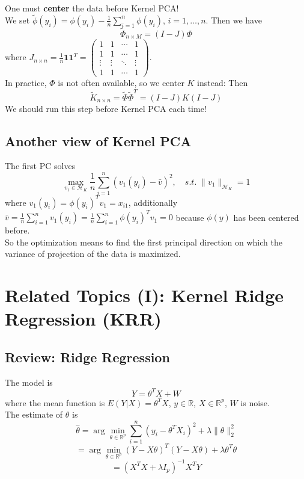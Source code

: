 \documentclass[12pt]{book}
\theoremstyle{definition}
\theoremstyle{remark}
\newcommand{\R}{\mathbb{R}}
\begin{document}
\begin{notionbox}[Note]
    One must \textbf{center} the data before Kernel PCA!\\
    We set $\tilde{\phi}(y_i) = \phi(y_i) - \frac1n\sum_{i=1}^n\phi(y_i)$, $i = 1,\dots,n$. Then we have
    \[\widetilde{\Phi}_{n\times M} = (I - J)\Phi\]
    where $J_{n\times n} = \frac1n\mathbf{1}\mathbf{1}^T = \begin{pmatrix}  
  1 & 1 & \cdots & 1 \\  
  1 & 1 & \cdots & 1 \\  
  \vdots & \vdots & \ddots & \vdots \\  
  1 & 1 & \cdots & 1  
\end{pmatrix}$.\\
In practice, $\Phi$ is not often available, so we center $K$ instead:
Then \[\widetilde{K}_{n\times n} = \widetilde{\Phi}\widetilde{\Phi}^T = (I-J)K(I-J)\]
We should run this step before Kernel PCA each time!
\end{notionbox}

\subsection{Another view of Kernel PCA}
The first PC solves 
\[\underset{v_1\in\mathcal{H}_K}{\max}\frac1n\sum_{i=1}^n(v_1(y_i) - \bar{v})^2, \quad s.t.\; \|v_1\|_{\mathcal{H}_K} = 1\]
where $v_1(y_i) = \phi(y_i)^Tv_1 = x_{i1}$, additionally $\bar{v} = \frac1n\sum_{i=1}^nv_1(y_i) = \frac1n\sum_{i=1}^n\phi(y_i)^Tv_1 = 0$ because $\phi(y)$ has been centered before.\\
So the optimization means to find the first principal direction on which the variance of projection of the data is maximized.



\newpage
\section{Related Topics (I): Kernel Ridge Regression (KRR)}
\subsection{Review: Ridge Regression}

The model is 
\[Y = \theta^TX+W\] where the mean function is $E(Y|X) = \theta^TX$, $y\in\R$, $X\in\R^p$, $W$ is noise.\\

The estimate of $\theta$ is 
\[\hat{\theta} = \arg\underset{\theta\in\R^p}{\min}\sum_{i=1}^n(y_i - \theta^TX_i)^2+\lambda\|\theta\|_2^2\]
\[ = \arg\underset{\theta\in\R^p}{\min}(Y-X\theta)^T(Y-X\theta)+\lambda\theta^T\theta\]
\[ = (X^TX+\lambda I_p)^{-1}X^TY\]
\end{document}
